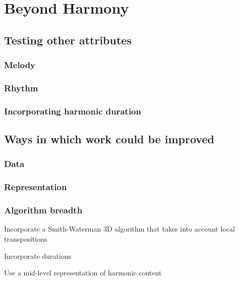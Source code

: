 \chapter{Beyond Harmony}

\section{Testing other attributes}

\subsection{Melody}

\subsection{Rhythm}

\subsection{Incorporating harmonic duration}

\section{Ways in which work could be improved}

\subsection{Data}

\subsection{Representation}

\subsection{Algorithm breadth}

\item Incorporate a Smith-Waterman 3D algorithm that takes into account local transpositions \cite{allali2007local} \cite{hanna2008improvements}
\item Incorporate durations
\item Use a mid-level representation of harmonic content \cite{BelloEtAl_2005_ARobuMidRepr}